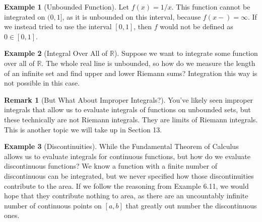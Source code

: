 \documentclass{article}
\newcommand{\R}{\mathbb{R}}
\theoremstyle{definition}
\newtheorem{example}{Example}[section]
\newtheorem{remark}{Remark}[section]
\begin{document}
	\begin{example}[Unbounded Function]
		Let $ f(x)=1/x $. This function cannot be integrated on $ (0,1] $, as it is unbounded on this interval, because $ f(x-)=\infty $. If we instead tried to use the interval $ [0,1] $, then $ f $ would not be defined as $ 0\in[0,1] $.  
	\end{example}
	\begin{example}[Integral Over All of $ \R $]
		Suppose we want to integrate some function over all of $ \R $. The whole real line is unbounded, so how do we measure the length of an infinite set and find upper and lower Riemann sums? Integration this way is not possible in this case. 
	\end{example}
	\begin{remark}[But What About Improper Integrals?]
		You've likely seen improper integrals that allow us to evaluate integrals of functions on unbounded sets, but these technically are not Riemann integrals. They are limits of Riemann integrals. This is another topic we will take up in Section 13. 
	\end{remark}
	\begin{example}[Discontinuities]
		While the Fundamental Theorem of Calculus allows us to evaluate integrals for continuous functions, but how do we evaluate discontinuous functions? We know a function with a finite number of discontinuous can be integrated, but we never specified how those discontinuities contribute to the area. If we follow the reasoning from Example 6.11, we would hope that they contribute nothing to area, as there are an uncountably infinite number of continuous points on $ [a,b] $ that greatly out number the discontinuous ones. 
	\end{example}
	
	
	\newpage
	
	
\end{document}
